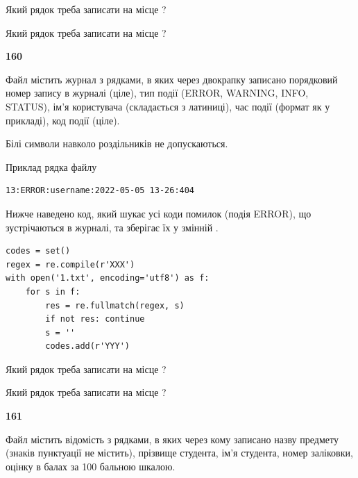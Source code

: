 Який рядок треба записати на місце  ?\par
\vspace{5mm}


Який рядок треба записати на місце  ?\par


\newpage

{\begin {center}\textbf{ 160}\end {center}}\par
Файл  містить журнал з рядками, в яких через двокрапку записано поряд\-ко\-вий номер запису в журналі (ціле), тип події (ERROR, WARNING, INFO, STATUS), ім'я користувача (складається з латиниці), час події (фор\-мат як у прикладі), код події (ціле).

Білі символи навколо роздільників не допускаються.

Приклад рядка файлу



\begin{verbatim}
13:ERROR:username:2022-05-05 13-26:404
\end{verbatim}


Нижче наведено код, який шукає усі коди помилок (подія ERROR), що зустріча\-ють\-ся в журналі, та зберігає їх у змінній .



\begin{verbatim}
codes = set()
regex = re.compile(r'XXX')
with open('1.txt', encoding='utf8') as f:
    for s in f:
        res = re.fullmatch(regex, s)
        if not res: continue
        s = ''
        codes.add(r'YYY')
\end{verbatim}





Який рядок треба записати на місце  ?\par
\vspace{5mm}


Який рядок треба записати на місце  ?\par


\newpage

{\begin {center}\textbf{ 161}\end {center}}\par
Файл  містить відомість з рядками, в яких через кому записа\-но назву предмету (знаків пунктуації не містить), прізвище студента, ім'я студента, номер залі\-ков\-ки, оцінку в балах за 100 бальною шкалою.

